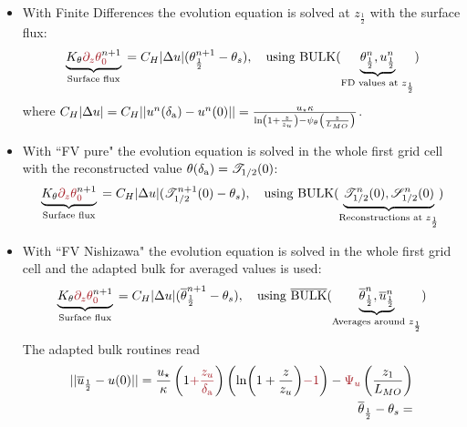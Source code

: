 \begin{itemize}
	\item With Finite Differences the evolution equation is
		solved at $z_{\frac{1}{2}}$ with the surface flux:
		\begin{equation}
			\underbrace{K_\theta
			\emphase{\partial_z \theta}^{n+1}_\emphase{0}}_{\text{
				Surface flux
			}} =
			C_H|\Delta u|(
			\theta_{\frac{1}{2}}^{n+1} - \theta_s),
			~~~ \text{using } {\rm BULK}
			(\underbrace{\theta_{\frac{1}{2}}^{n},
			u_{\frac{1}{2}}^{n}}_{
				\text{FD values at } z_{\frac{1}{2}}
			})
		\end{equation}
		where 
$C_H|\Delta u| = C_H||u^n(\delta_{\rm a})- u^n(0)|| = 
\frac{u_\star \kappa}{\ln\left(1+\frac{z}{z_{u}}\right)
    - \psi_\theta\left(\frac{z}{L_{MO}}\right) }$.

	\item With ``FV pure" the evolution equation is solved in 
		the whole first grid cell with the reconstructed
		value $\theta(\delta_{\rm a}) = {\cal T}_{1/2}(0)$:
		\begin{equation}
			\underbrace{K_\theta
			\emphase{\partial_z \theta}^{n+1}_\emphase{0}}_{\text{
				Surface flux
			}} =
			C_H|\Delta u|({\cal T}_{1/2}^{n+1}(0)
			- \theta_s),
			~~~ \text{using } {\rm BULK}
			(\underbrace{{\cal T}_{1/2}^{n}(0),
			{\cal S}_{1/2}^{n}(0)}_{
			\text{Reconstructions at } z_{\frac{1}{2}}
			})
		\end{equation}
	\item With ``FV Nishizawa" the evolution equation is solved in
		the whole first grid cell and the adapted bulk
		for averaged values is used:
		\begin{equation}
			\underbrace{K_\theta
			\emphase{\partial_z \theta}^{n+1}_\emphase{0}}_{\text{
				Surface flux
			}} =
			C_H|\Delta u| (
			\overline{\theta}_{\frac{1}{2}}^{n+1}
			- \theta_s),
			~~~ \text{using } \overline{\rm BULK}
			(\underbrace{\overline{\theta}_{\frac{1}{2}}^{n},
			\overline{u}_{\frac{1}{2}}^{n}}_{
			\text{Averages around } z_\frac{1}{2}})
		\end{equation}
		The adapted bulk routines read
		\begin{equation}
		\begin{aligned}
			 ||\overline{u}_{\frac{1}{2}}-u(0)||
			 = \frac{u_\star}{\kappa}
			\left(1\emphase{+\frac{z_u}{\delta_{\rm a}}}\right)
		\left(\ln(1+\frac{z}{z_u})\emphase{-1}\right)
		- \emphase{\Psi_u}\left(\frac{z_1}{L_{MO}}\right)
		    \\
			\overline{\theta}_{\frac{1}{2}} - \theta_s=

\end{aligned}
\end{equation}
\end{itemize}
